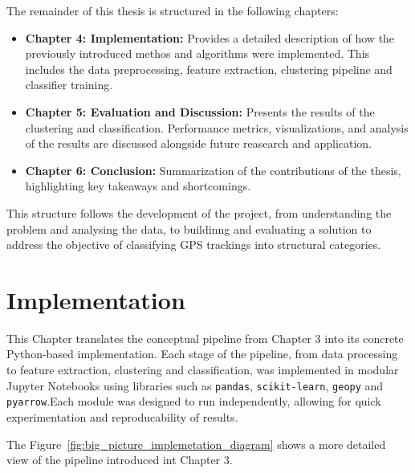\documentclass[a4paper,12pt,twoside]{scrreprt}
\begin{document}
The remainder of this thesis is structured in the following chapters:

\begin{itemize}
  \item \textbf{Chapter 4: Implementation:} Provides a detailed description of
        how the previously introduced methos and algorithms were implemented.
        This
        includes the data preprocessing, feature extraction, clustering
        pipeline and
        classifier training.
  \item \textbf{Chapter 5: Evaluation and Discussion:} Presents the results of
        the clustering and classification. Performance metrics, visualizations,
        and
        analysis of the results are discussed alongside future reasearch and
        application.
  \item \textbf{Chapter 6: Conclusion:} Summarization of the contributions of
        the thesis, highlighting key takeaways and shortcomings.
\end{itemize}

This structure follows the development of the project, from understanding the
problem and analysing the data, to buildinng and evaluating a solution to
address the objective of classifying GPS trackings into structural categories.
\chapter{Implementation}

This Chapter translates the conceptual pipeline from Chapter 3 into its
concrete Python-based implementation.
Each stage of the pipeline, from data processing to feature extraction,
clustering and classification, was implemented in modular Jupyter Notebooks
using libraries such as \texttt{pandas}, \texttt{scikit-learn}, \texttt{geopy}
and \texttt{pyarrow}.Each module was designed to run independently, allowing
for quick
experimentation and reproducability of results.


The
Figure~\ref{fig:big_picture_implemetation_diagram} shows a more detailed view
of the pipeline introduced int Chapter 3.
\end{document}
